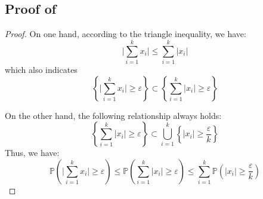 \documentclass{article}
\begin{document}
\subsection{Proof of }\label{proof:1/nepsilon}
\begin{proof}
On one hand, according to the triangle inequality, we have:
\begin{equation}
    \Bigg|\sum_{i=1}^{k}x_i\Bigg| \leq \sum_{i=1}^{k}|x_i|
\end{equation}
which also indicates
\begin{equation}
    \left\{\Bigg|\sum_{i=1}^{k}x_i\Bigg| \geq \varepsilon\right\} \subset \left\{\sum_{i=1}^{k}|x_i| \geq \varepsilon\right\}
\end{equation}

On the other hand, the following relationship always holds:
\begin{equation}
    \left\{\sum_{i=1}^{k}|x_i| \geq \varepsilon\right\} \subset \bigcup_{i=1}^k \left\{|x_i| \geq \frac{\varepsilon}{k}\right\}
\end{equation}
Thus, we have:
\begin{equation}
    \mathbb{P}\left(\Bigg|\sum_{i=1}^{k}x_i\Bigg| \geq \varepsilon\right) \leq \mathbb{P}\left(\sum_{i=1}^{k}|x_i| \geq \varepsilon\right) \leq \sum_{i=1}^{k}\mathbb{P}\left(|x_i| \geq \frac{\varepsilon}{k}\right)
\end{equation}

\end{proof}
\end{document}

